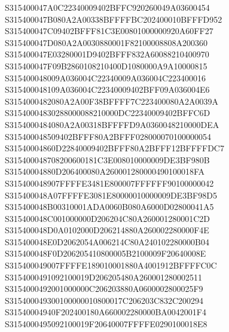 \documentclass[12pt,a4paper]{article}
\begin{document}
\begin{framed}
{S315400047A0C22340009402BFFC920260049A03600454\newline
S315400047B080A2A00338BFFFFBC202400010BFFFD952\newline
S315400047C09402BFFF81C3E00801000000920A60FF27\newline
S315400047D080A2A0030880001F82100008808A200360\newline
S315400047E03280001D9402BFFF832A60088210400970\newline
S315400047F09B2860108210400D1080000A9A10000815\newline
S315400048009A036004C22340009A036004C223400016\newline
S315400048109A036004C22340009402BFF09A036004E6\newline
S3154000482080A2A00F38BFFFF7C223400080A2A0039A\newline
S31540004830288000088210000DC22340009402BFFC6D\newline
S3154000484080A2A00318BFFFFD9A0360048210000DEA\newline
S315400048509402BFFF80A2BFFF028000070100000054\newline
S31540004860D22840009402BFFF80A2BFFF12BFFFFDC7\newline
S315400048708200600181C3E008010000009DE3BF980B\newline
S31540004880D206400080A260001280000490100018FA\newline
S315400048907FFFFE3481E800007FFFFFF90100000042\newline
S315400048A07FFFFE3081E80000010000009DE3BF98D5\newline
S315400048B00310001ADA0060B080A6000D02800041A5\newline
S315400048C001000000D206204C80A260001280001C2D\newline
S315400048D0A0102000D206214880A260002280000F4E\newline
S315400048E0D2062054A006214C80A240102280000B04\newline
S315400048F0D206205410800005B2100009F20640008E\newline
S315400049007FFFFE189010001880A4001912BFFFFC0C\newline
S3154000491092100019D206205480A260001280002511\newline
S3154000492001000000C206203880A0600002800025F9\newline
S315400049300100000010800017C206203C832C200294\newline
S31540004940F202400180A660002280000BA0042001F4\newline
S3154000495092100019F20640007FFFFE0290100018E8\newline
}
\end{framed}
\end{document}
